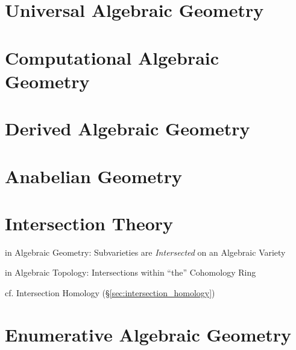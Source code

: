 \begin{itemize}
\begin{itemize}
\section{Universal Algebraic Geometry}\label{sec:universal_geometry}

\section{Computational Algebraic Geometry}
\label{sec:computational_algebraic_geometry}

\section{Derived Algebraic Geometry}
\label{sec:derived_algebraic_geometry}

\section{Anabelian Geometry}\label{sec:anabelian_geometry}

\section{Intersection Theory}\label{sec:intersection_theory}

in Algebraic Geometry: Subvarieties are \emph{Intersected} on an
Algebraic Variety

in Algebraic Topology: Intersections within ``the'' Cohomology Ring

\fist cf. Intersection Homology (\S\ref{sec:intersection_homology})



\section{Enumerative Algebraic Geometry}
\label{sec:enumerative_algebraic_geometry}




\end{itemize}
\end{itemize}
